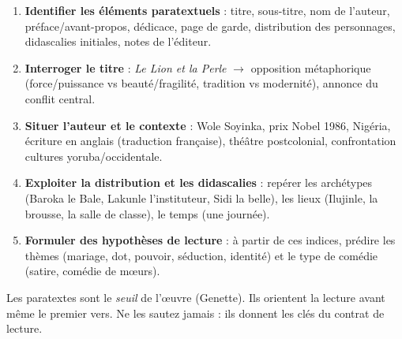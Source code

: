 \documentclass[11pt]{article}
\newcommand{\cle}[1]{{\popxbold\color{popdark}#1}}
\begin{document}
\begin{methode}
\begin{enumerate}
\item \textbf{Identifier les éléments paratextuels} : titre, sous-titre, nom de l'auteur, préface/avant-propos, dédicace, page de garde, distribution des personnages, didascalies initiales, notes de l'éditeur.
\item \textbf{Interroger le titre} : \emph{Le Lion et la Perle} $\rightarrow$ opposition métaphorique (force/puissance vs beauté/fragilité, tradition vs modernité), annonce du conflit central.
\item \textbf{Situer l'auteur et le contexte} : Wole \cle{Soyinka}, prix Nobel 1986, Nigéria, écriture en anglais (traduction française), théâtre postcolonial, confrontation cultures yoruba/occidentale.
\item \textbf{Exploiter la distribution et les didascalies} : repérer les archétypes (Baroka le Bale, Lakunle l'instituteur, Sidi la belle), les lieux (Ilujinle, la brousse, la salle de classe), le temps (une journée).
\item \textbf{Formuler des hypothèses de lecture} : à partir de ces indices, prédire les thèmes (mariage, dot, pouvoir, séduction, identité) et le type de comédie (satire, comédie de mœurs).
\end{enumerate}
\begin{aretenir}
Les paratextes sont le \emph{seuil} de l'œuvre (Genette). Ils orientent la lecture avant même le premier vers. Ne les sautez jamais : ils donnent les clés du contrat de lecture.
\end{aretenir}
\end{methode}
\end{document}
